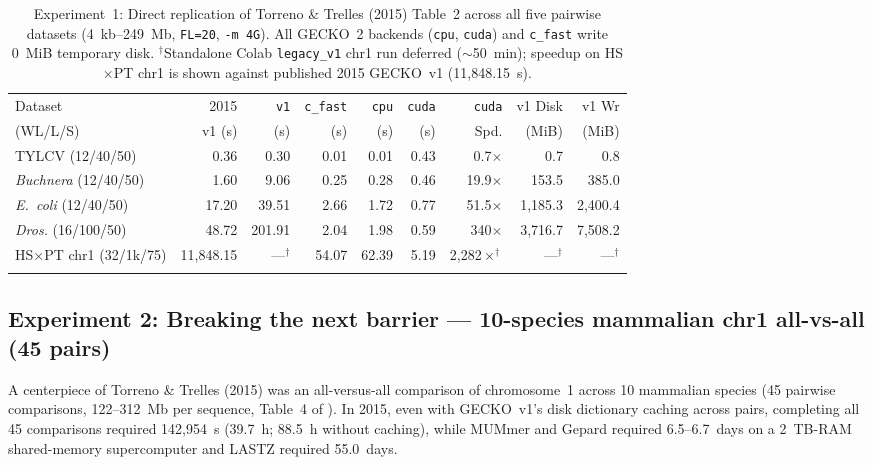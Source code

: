 \documentclass[pdflatex,sn-vancouver,Numbered]{sn-jnl}
\newcommand{\eOneTylcvVone}{0.30}
\newcommand{\eOneTylcvCfast}{0.01}
\newcommand{\eOneTylcvCpu}{0.01}
\newcommand{\eOneTylcvCuda}{0.43}
\newcommand{\eOneTylcvSp}{0.7$\times$}
\newcommand{\eOneTylcvDisk}{0.7}
\newcommand{\eOneTylcvWr}{0.8}
\newcommand{\eOneBuchVone}{9.06}
\newcommand{\eOneBuchCfast}{0.25}
\newcommand{\eOneBuchCpu}{0.28}
\newcommand{\eOneBuchCuda}{0.46}
\newcommand{\eOneBuchSp}{19.9$\times$}
\newcommand{\eOneBuchDisk}{153.5}
\newcommand{\eOneBuchWr}{385.0}
\newcommand{\eOneEcoliVone}{39.51}
\newcommand{\eOneEcoliCfast}{2.66}
\newcommand{\eOneEcoliCpu}{1.72}
\newcommand{\eOneEcoliCuda}{0.77}
\newcommand{\eOneEcoliSp}{51.5$\times$}
\newcommand{\eOneEcoliDisk}{1,185.3}
\newcommand{\eOneEcoliWr}{2,400.4}
\newcommand{\eOneDrosVone}{201.91}
\newcommand{\eOneDrosCfast}{2.04}
\newcommand{\eOneDrosCpu}{1.98}
\newcommand{\eOneDrosCuda}{0.59}
\newcommand{\eOneDrosSp}{340$\times$}
\newcommand{\eOneDrosDisk}{3,716.7}
\newcommand{\eOneDrosWr}{7,508.2}
\newcommand{\eOneChrOneVone}{---$^\dagger$}
\newcommand{\eOneChrOneCfast}{54.07}
\newcommand{\eOneChrOneCpu}{62.39}
\newcommand{\eOneChrOneCuda}{5.19}
\newcommand{\eOneChrOneSp}{2,282$\times^\dagger$}
\newcommand{\eOneChrOneDisk}{---$^\dagger$}
\begin{document}
\begin{table}[ht]
\centering
\scriptsize
\setlength{\tabcolsep}{1.2pt}
\caption{Experiment~1: Direct replication of Torreno \& Trelles (2015) Table~2 across all five pairwise datasets (4~kb--249~Mb, \texttt{FL=20}, \texttt{-m 4G}). All GECKO~2 backends (\texttt{cpu}, \texttt{cuda}) and \texttt{c\_fast} write 0~MiB temporary disk. $^\dagger$Standalone Colab \texttt{legacy\_v1} chr1 run deferred ($\sim$50~min); speedup on HS$\times$PT chr1 is shown against published 2015 GECKO~v1 (11,848.15~s).}\label{tab:exp1}
\begin{tabular*}{\textwidth}{@{\extracolsep\fill}lrrrrrrrr}
\toprule
Dataset & 2015 & \texttt{v1} & \texttt{c\_fast} & \texttt{cpu} & \texttt{cuda} & \texttt{cuda} & v1 Disk & v1 Wr \\
(WL/L/S) & v1 (s) & (s) & (s) & (s) & (s) & Spd. & (MiB) & (MiB) \\
\midrule
TYLCV (12/40/50)           & 0.36      & \eOneTylcvVone  & \eOneTylcvCfast  & \eOneTylcvCpu  & \eOneTylcvCuda  & \eOneTylcvSp  & \eOneTylcvDisk & \eOneTylcvWr \\
\textit{Buchnera} (12/40/50) & 1.60    & \eOneBuchVone   & \eOneBuchCfast   & \eOneBuchCpu   & \eOneBuchCuda   & \eOneBuchSp   & \eOneBuchDisk & \eOneBuchWr \\
\textit{E.~coli} (12/40/50)  & 17.20   & \eOneEcoliVone  & \eOneEcoliCfast  & \eOneEcoliCpu  & \eOneEcoliCuda  & \eOneEcoliSp  & \eOneEcoliDisk & \eOneEcoliWr \\
\textit{Dros.} (16/100/50) & 48.72     & \eOneDrosVone   & \eOneDrosCfast   & \eOneDrosCpu   & \eOneDrosCuda   & \eOneDrosSp   & \eOneDrosDisk & \eOneDrosWr \\
HS$\times$PT chr1 (32/1k/75) & 11,848.15 & \eOneChrOneVone & \eOneChrOneCfast & \eOneChrOneCpu & \eOneChrOneCuda & \eOneChrOneSp & \eOneChrOneDisk & \eOneChrOneDisk \\
\botrule
\end{tabular*}
\end{table}

\subsection{Experiment 2: Breaking the next barrier --- 10-species mammalian chr1 all-vs-all (45 pairs)}\label{subsec:exp2}

A centerpiece of Torreno \& Trelles (2015) was an all-versus-all comparison of chromosome~1 across 10 mammalian species (45 pairwise comparisons, 122--312~Mb per sequence, Table~4 of \cite{torreno2015gecko}). In 2015, even with GECKO~v1's disk dictionary caching across pairs, completing all 45 comparisons required 142,954~s (39.7~h; 88.5~h without caching), while MUMmer and Gepard required 6.5--6.7~days on a 2~TB-RAM shared-memory supercomputer and LASTZ required 55.0~days.
\end{document}
